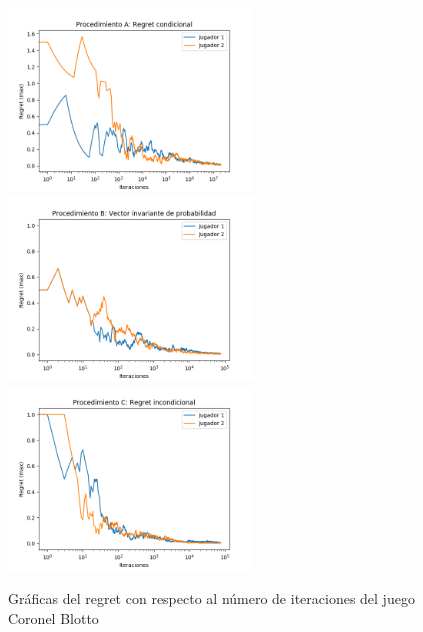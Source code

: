 \begin{figure}[htpb!]
    \caption{Gráficas del regret con respecto al número de iteraciones del juego Coronel Blotto}
    \label{fig:regret-blotto}
    \centering
    \includegraphics[width=0.58\textwidth]{graficas/coronel-blotto/procedimiento-A.png}
    \includegraphics[width=0.58\textwidth]{graficas/coronel-blotto/procedimiento-B.png}
    \includegraphics[width=0.58\textwidth]{graficas/coronel-blotto/procedimiento-C.png}
\end{figure}

